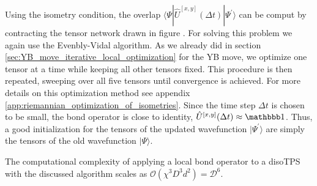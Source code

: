 Using the isometry condition, the overlap $\langle\Psi|\hat{U}^{[x,y]}(\Delta t)|\Psi^\prime\rangle$ can be comput by contracting the tensor network drawn in figure . For solving this problem we again use the Evenbly-Vidal algorithm. As we already did in section \ref{sec:YB_move_iterative_local_optimization} for the YB move, we optimize one tensor at a time while keeping all other tensors fixed. This procedure is then repeated, sweeping over all five tensors until convergence is achieved. For more details on this optimization method see appendix \ref{app:riemannian_optimization_of_isometries}. Since the time step $\Delta t$ is chosen to be small, the bond operator is close to identity, $\hat{U}^{[x,y]}(\Delta t)\approx\id$. Thus, a good initialization for the tensors of the updated wavefunction $|\Psi^\prime\rangle$ are simply the tensors of the old wavefunction $|\Psi\rangle$. \par
The computational complexity of applying a local bond operator to a disoTPS with the discussed algorithm scales as $\mathcal{O}(\chi^3D^3d^2) = \mathcal{D^6}$. 
